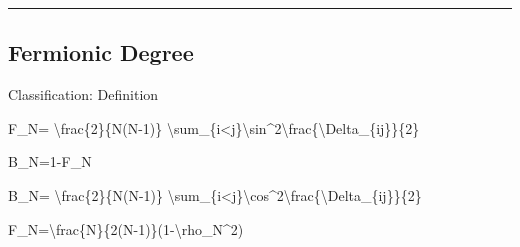 \documentclass[
  a4paper]{article}
\newenvironment{Shaded}{}{}
\newcommand{\NormalTok}[1]{#1}
\begin{document}
\begin{center}\rule{0.5\linewidth}{0.5pt}\end{center}

\subsection{Fermionic Degree}\label{fermionic-degree}

Classification: Definition

\begin{Shaded}
\begin{Highlighting}[]
\NormalTok{F\_N=}
\NormalTok{\textbackslash{}frac\{2\}\{N(N{-}1)\}}
\NormalTok{\textbackslash{}sum\_\{i\textless{}j\}\textbackslash{}sin\^{}2\textbackslash{}frac\{\textbackslash{}Delta\_\{ij\}\}\{2\}}
\end{Highlighting}
\end{Shaded}

\begin{Shaded}
\begin{Highlighting}[]
\NormalTok{B\_N=1{-}F\_N}
\end{Highlighting}
\end{Shaded}

\begin{Shaded}
\begin{Highlighting}[]
\NormalTok{B\_N=}
\NormalTok{\textbackslash{}frac\{2\}\{N(N{-}1)\}}
\NormalTok{\textbackslash{}sum\_\{i\textless{}j\}\textbackslash{}cos\^{}2\textbackslash{}frac\{\textbackslash{}Delta\_\{ij\}\}\{2\}}
\end{Highlighting}
\end{Shaded}

\begin{Shaded}
\begin{Highlighting}[]
\NormalTok{F\_N=\textbackslash{}frac\{N\}\{2(N{-}1)\}(1{-}\textbackslash{}rho\_N\^{}2)}
\end{Highlighting}
\end{Shaded}
\end{document}
